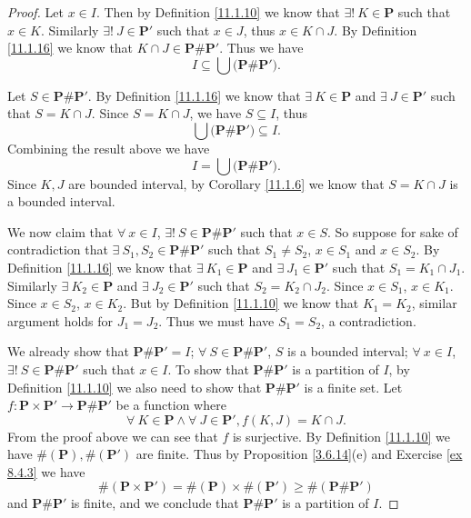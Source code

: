 \begin{proof}
    Let \(x \in I\).
    Then by Definition \ref{11.1.10} we know that \(\exists!\ K \in \mathbf{P}\) such that \(x \in K\).
    Similarly \(\exists!\ J \in \mathbf{P}'\) such that \(x \in J\), thus \(x \in K \cap J\).
    By Definition \ref{11.1.16} we know that \(K \cap J \in \mathbf{P} \# \mathbf{P}'\).
    Thus we have
    \[
        I \subseteq \bigcup \big(\mathbf{P} \# \mathbf{P}'\big).
    \]

    Let \(S \in \mathbf{P} \# \mathbf{P}'\).
    By Definition \ref{11.1.16} we know that \(\exists\ K \in \mathbf{P}\) and \(\exists\ J \in \mathbf{P}'\) such that \(S = K \cap J\).
    Since \(S = K \cap J\), we have \(S \subseteq I\), thus
    \[
        \bigcup \big(\mathbf{P} \# \mathbf{P}'\big) \subseteq I.
    \]
    Combining the result above we have
    \[
        I = \bigcup \big(\mathbf{P} \# \mathbf{P}'\big).
    \]
    Since \(K, J\) are bounded interval, by Corollary \ref{11.1.6} we know that \(S = K \cap J\) is a bounded interval.

    We now claim that \(\forall\ x \in I\), \(\exists!\ S \in \mathbf{P} \# \mathbf{P}'\) such that \(x \in S\).
    So suppose for sake of contradiction that \(\exists\ S_1, S_2 \in \mathbf{P} \# \mathbf{P}'\) such that \(S_1 \neq S_2\), \(x \in S_1\) and \(x \in S_2\).
    By Definition \ref{11.1.16} we know that \(\exists\ K_1 \in \mathbf{P}\) and \(\exists\ J_1 \in \mathbf{P}'\) such that \(S_1 = K_1 \cap J_1\).
    Similarly \(\exists\ K_2 \in \mathbf{P}\) and \(\exists\ J_2 \in \mathbf{P}'\) such that \(S_2 = K_2 \cap J_2\).
    Since \(x \in S_1\), \(x \in K_1\).
    Since \(x \in S_2\), \(x \in K_2\).
    But by Definition \ref{11.1.10} we know that \(K_1 = K_2\), similar argument holds for \(J_1 = J_2\).
    Thus we must have \(S_1 = S_2\), a contradiction.

    We already show that \(\mathbf{P} \# \mathbf{P}' = I\);
    \(\forall\ S \in \mathbf{P} \# \mathbf{P}'\), \(S\) is a bounded interval;
    \(\forall\ x \in I\), \(\exists!\ S \in \mathbf{P} \# \mathbf{P}'\) such that \(x \in I\).
    To show that \(\mathbf{P} \# \mathbf{P}'\) is a partition of \(I\), by Definition \ref{11.1.10} we also need to show that \(\mathbf{P} \# \mathbf{P}'\) is a finite set.
    Let \(f : \mathbf{P} \times \mathbf{P}' \to \mathbf{P} \# \mathbf{P}'\) be a function where
    \[
        \forall\ K \in \mathbf{P} \land \forall\ J \in \mathbf{P}', f(K, J) = K \cap J.
    \]
    From the proof above we can see that \(f\) is surjective.
    By Definition \ref{11.1.10} we have \(\#(\mathbf{P}), \#(\mathbf{P}')\) are finite.
    Thus by Proposition \ref{3.6.14}(e) and Exercise \ref{ex 8.4.3} we have
    \[
        \#(\mathbf{P} \times \mathbf{P}') = \#(\mathbf{P}) \times \#(\mathbf{P}') \geq \#(\mathbf{P} \# \mathbf{P}')
    \]
    and \(\mathbf{P} \# \mathbf{P}'\) is finite, and we conclude that \(\mathbf{P} \# \mathbf{P}'\) is a partition of \(I\).


\end{proof}
